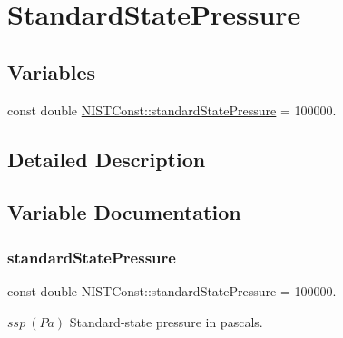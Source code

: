 \hypertarget{group___standard_state_pressure}{}\section{Standard\+State\+Pressure}
\label{group___standard_state_pressure}
\subsection*{Variables}
\begin{DoxyCompactItemize}
\item 
const double \hyperlink{group___standard_state_pressure_gaede4b63db291cd6a839180595c7a191d}{N\+I\+S\+T\+Const\+::standard\+State\+Pressure} = 100000.
\end{DoxyCompactItemize}


\subsection{Detailed Description}


\subsection{Variable Documentation}
\mbox{\label{group___standard_state_pressure_gaede4b63db291cd6a839180595c7a191d}} 
\subsubsection{\texorpdfstring{standard\+State\+Pressure}{standardStatePressure}}
{\footnotesize\ttfamily const double N\+I\+S\+T\+Const\+::standard\+State\+Pressure = 100000.}

$ssp \ (Pa)$ Standard-\/state pressure in pascals. 